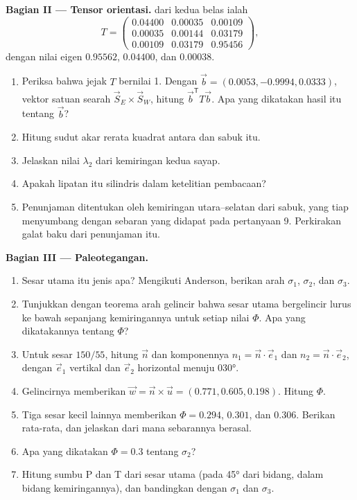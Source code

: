 \begin{problem}
\medskip\noindent\textbf{Bagian II --- Tensor orientasi.}
 dari kedua belas  ialah
\[
  T = \begin{pmatrix} 0.04400 & 0.00035 & 0.00109\\ 0.00035 & 0.00144 & 0.03179\\
  0.00109 & 0.03179 & 0.95456 \end{pmatrix},
\]
dengan nilai eigen $0.95562$, $0.04400$, dan $0.00038$.
\begin{enumerate}[resume]
  \item Periksa bahwa jejak $T$ bernilai 1. Dengan $\vec b = (0.0053, -0.9994,
        0.0333)$, vektor satuan searah $\vec S_E\times\vec S_W$, hitung
        $\vec b^{\mathsf T}T\vec b$. Apa yang dikatakan hasil itu tentang $\vec b$?
  \item Hitung sudut akar rerata kuadrat antara  dan sabuk itu.
  \item Jelaskan nilai $\lambda_2$ dari kemiringan kedua sayap.
  \item Apakah lipatan itu silindris dalam ketelitian pembacaan?
  \item Penunjaman  ditentukan oleh kemiringan utara--selatan dari
        sabuk, yang tiap  menyumbang dengan sebaran yang didapat pada
        pertanyaan 9. Perkirakan galat baku dari penunjaman itu.
\end{enumerate}

\medskip\noindent\textbf{Bagian III --- Paleotegangan.}
\begin{enumerate}[resume]
  \item Sesar utama itu jenis apa? Mengikuti Anderson, berikan
        arah $\sigma_1$, $\sigma_2$, dan $\sigma_3$.
  \item Tunjukkan dengan teorema arah gelincir bahwa sesar utama
        bergelincir lurus ke bawah sepanjang kemiringannya untuk setiap nilai $\Phi$. Apa
        yang dikatakannya tentang $\Phi$?
  \item Untuk sesar $150/55$, hitung $\vec n$ dan komponennya $n_1 =
        \vec n\cdot\vec e_1$ dan $n_2 = \vec n\cdot\vec e_2$, dengan $\vec e_1$
        vertikal dan $\vec e_2$ horizontal menuju \ang{030}.
  \item Gelincirnya memberikan $\vec w = \vec n\times\vec u = (0.771, 0.605, 0.198)$.
        Hitung $\Phi$.
  \item Tiga sesar kecil lainnya memberikan $\Phi = 0.294$, $0.301$, dan
        $0.306$. Berikan rata-rata, dan jelaskan dari mana sebarannya berasal.
  \item Apa yang dikatakan $\Phi = 0.3$ tentang $\sigma_2$?
  \item Hitung sumbu P dan T dari sesar utama (pada \ang{45} dari
        bidang, dalam bidang kemiringannya), dan bandingkan dengan $\sigma_1$ dan
        $\sigma_3$.
\end{enumerate}


\end{problem}
